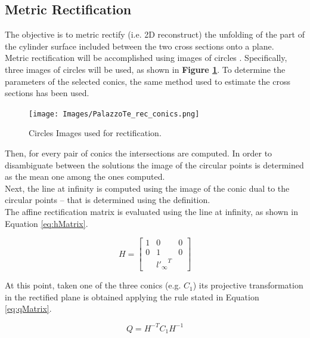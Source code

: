 \documentclass[12pt,a4paper]{article}
\begin{document}
\subsection{Metric Rectification}
\label{sec:shapeReconstruction}
The objective is to metric rectify (i.e. 2D reconstruct) the unfolding of the part of the cylinder surface included between the two cross sections onto a plane.\\

Metric rectification will be accomplished using images of circles \cite{MetRecCircles}. Specifically, three images of circles will be used, as shown in \textbf{Figure \ref{fig:recConics}}. To determine the parameters of the selected conics, the same method used to estimate the cross sections has been used.

\begin{figure}[H]
    \centering
    \texttt{[image: Images/PalazzoTe\_rec\_conics.png]}
    \caption[Circles Images used for rectification.]{Circles Images used for rectification.}
    \label{fig:recConics}
\end{figure}

Then, for every pair of conics the intersections are computed. In order to disambiguate between the solutions the image of the circular points is determined as the mean one among the ones computed.\\

Next, the line at infinity is computed using the image of the conic dual to the circular points -- that is determined using the definition.\\

The affine rectification matrix is evaluated using the line at infinity, as shown in Equation \ref{eq:hMatrix}.

\begin{equation}
    H = 
    \begin{bmatrix}
    1 & 0 & 0\\
    0 & 1 & 0\\
    & {l'_\infty}^T &
    \end{bmatrix}
    \label{eq:hMatrix}
\end{equation}
\bigskip

At this point, taken one of the three conics (e.g. $C_1$) its projective transformation in the rectified plane is obtained applying the rule stated in Equation \ref{eq:qMatrix}.

\begin{equation}
    Q = H^{-T}C_1H^{-1}
    \label{eq:qMatrix}
\end{equation}
\bigskip
\end{document}
